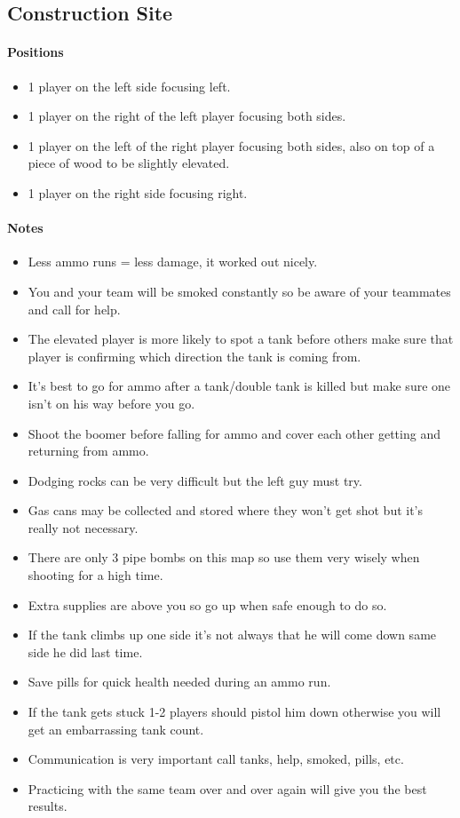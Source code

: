 \subsection{Construction Site}
\paragraph{Positions}
\begin{itemize}
\item 1 player on the left side focusing left.
\item 1 player on the right of the left player focusing both sides.
\item 1 player on the left of the right player focusing both sides, also on top of a piece of wood to be slightly elevated.
\item 1 player on the right side focusing right.
\end{itemize}

\paragraph{Notes}
\begin{itemize}
\item Less ammo runs = less damage, it worked out nicely.
\item You and your team will be smoked constantly so be aware of your teammates and call for help.
\item The elevated player is more likely to spot a tank before others make sure that player is confirming which direction the tank is coming from.
\item It’s best to go for ammo after a tank/double tank is killed but make sure one isn’t on his way before you go. 
\item Shoot the boomer before falling for ammo and cover each other getting and returning from ammo.
\item Dodging rocks can be very difficult but the left guy must try.
\item Gas cans may be collected and stored where they won’t get shot but it’s really not necessary. 
\item There are only 3 pipe bombs on this map so use them very wisely when shooting for a high time.
\item Extra supplies are above you so go up when safe enough to do so.
\item If the tank climbs up one side it’s not always that he will come down same side he did last time. 
\item Save pills for quick health needed during an ammo run.
\item If the tank gets stuck 1-2 players should pistol him down otherwise you will get an embarrassing tank count.
\item Communication is very important call tanks, help, smoked, pills, etc.
\item Practicing with the same team over and over again will give you the best results.
\end{itemize}

